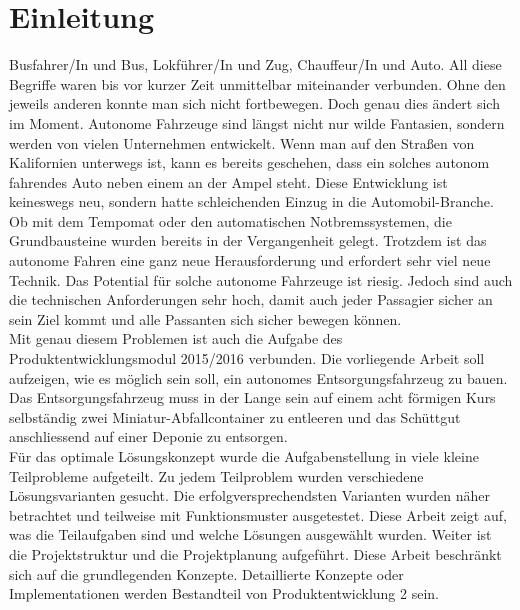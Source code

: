 \section{Einleitung}
Busfahrer/In und Bus, Lokführer/In und Zug, Chauffeur/In und Auto. All diese Begriffe waren bis vor kurzer Zeit unmittelbar miteinander verbunden. Ohne den jeweils anderen konnte man sich nicht fortbewegen. Doch genau dies ändert sich im Moment. Autonome Fahrzeuge sind längst nicht nur wilde Fantasien, sondern werden von vielen Unternehmen entwickelt. Wenn man auf den Straßen von Kalifornien unterwegs ist, kann es bereits geschehen, dass ein solches autonom fahrendes Auto neben einem an der Ampel steht. Diese Entwicklung ist keineswegs neu, sondern hatte schleichenden Einzug in die Automobil-Branche. Ob mit dem Tempomat oder den automatischen Notbremssystemen, die Grundbausteine wurden bereits in der Vergangenheit gelegt.
Trotzdem ist das autonome Fahren eine ganz neue Herausforderung und erfordert sehr viel neue Technik. Das Potential für solche autonome Fahrzeuge ist riesig. Jedoch sind auch die technischen Anforderungen sehr hoch, damit auch jeder Passagier sicher an sein Ziel kommt und alle Passanten sich sicher bewegen können. \\
Mit genau diesem Problemen ist auch die Aufgabe des Produktentwicklungsmodul 2015/2016 verbunden. Die vorliegende Arbeit soll aufzeigen, wie es möglich sein soll, ein autonomes Entsorgungsfahrzeug zu bauen. Das Entsorgungsfahrzeug muss in der Lange sein auf einem acht förmigen Kurs selbständig zwei Miniatur-Abfallcontainer zu entleeren und das Schüttgut anschliessend auf einer Deponie zu entsorgen.\\
Für das optimale Lösungskonzept wurde die Aufgabenstellung in viele kleine Teilprobleme aufgeteilt. Zu jedem Teilproblem wurden verschiedene Lösungsvarianten gesucht. Die erfolgversprechendsten Varianten wurden näher betrachtet und teilweise mit Funktionsmuster ausgetestet. Diese Arbeit zeigt auf, was die Teilaufgaben sind und welche Lösungen ausgewählt wurden. Weiter ist die Projektstruktur und die Projektplanung aufgeführt. Diese Arbeit beschränkt sich auf die grundlegenden Konzepte. Detaillierte Konzepte oder Implementationen werden Bestandteil von Produktentwicklung 2 sein. 
